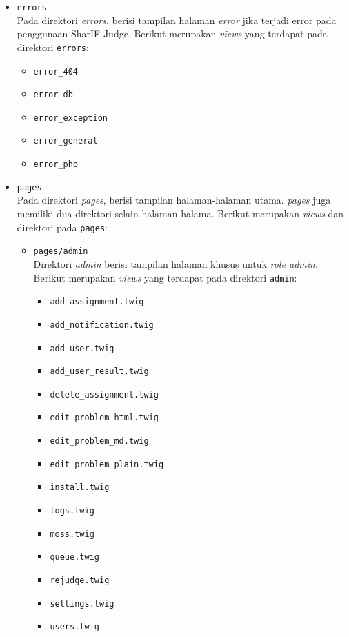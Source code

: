 \begin{itemize}
	\item \verb|errors| \\
	      Pada direktori \textit{errors}, berisi tampilan halaman \textit{error} jika terjadi error pada penggunaan SharIF Judge. Berikut merupakan \textit{views} yang terdapat pada direktori \verb|errors|:

	      \begin{itemize}
		      \item \verb|error_404|
		      \item \verb|error_db|
		      \item \verb|error_exception|
		      \item \verb|error_general|
		      \item \verb|error_php|
	      \end{itemize}

	\item \verb|pages| \\
	      Pada direktori \textit{pages}, berisi tampilan halaman-halaman utama. \textit{pages} juga memiliki dua direktori selain halaman-halama. Berikut merupakan \textit{views} dan direktori pada \verb|pages|:

	      \begin{itemize}
		      \item \verb|pages/admin| \\
		            Direktori \textit{admin} berisi tampilan halaman khusus untuk \textit{role admin}. Berikut merupakan \textit{views} yang terdapat pada direktori \verb|admin|:

		            \begin{itemize}
			            \item \verb|add_assignment.twig|
			            \item \verb|add_notification.twig|
			            \item \verb|add_user.twig|
			            \item \verb|add_user_result.twig|
			            \item \verb|delete_assignment.twig|
			            \item \verb|edit_problem_html.twig|
			            \item \verb|edit_problem_md.twig|
			            \item \verb|edit_problem_plain.twig|
			            \item \verb|install.twig|
			            \item \verb|logs.twig|
			            \item \verb|moss.twig|
			            \item \verb|queue.twig|
			            \item \verb|rejudge.twig|
			            \item \verb|settings.twig|
			            \item \verb|users.twig|
		            \end{itemize}


\end{itemize}
\end{itemize}
